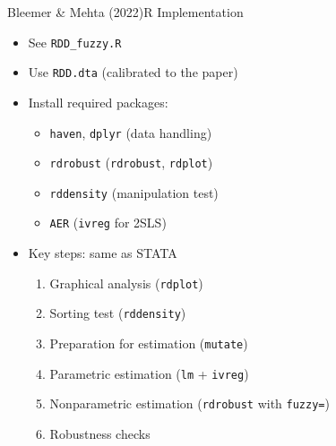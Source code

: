 \documentclass[hyperref={pdfpagelabels=false}]{beamer}
\begin{document}
\begin{frame}{Bleemer \& Mehta (2022)}{R Implementation}
	\begin{itemize}
		\item See \texttt{RDD\_fuzzy.R}
		\vspace{0.2cm}
		\item Use \texttt{RDD.dta} (calibrated to the paper)
		\vspace{0.2cm}
		\item Install required packages:
		\begin{itemize}
			\vspace{0.2cm}
			\item \texttt{haven}, \texttt{dplyr} (data handling)
			\item \texttt{rdrobust} (\texttt{rdrobust}, \texttt{rdplot})
			\item \texttt{rddensity} (manipulation test)
			\item \texttt{AER} (\texttt{ivreg} for 2SLS)
		\end{itemize}
		\vspace{0.2cm}
		\item Key steps: same as STATA
		\begin{enumerate}
			\vspace{0.2cm}
			\item Graphical analysis (\texttt{rdplot})
			\item Sorting test (\texttt{rddensity})
			\item Preparation for estimation (\texttt{mutate})
			\item Parametric estimation (\texttt{lm} + \texttt{ivreg})
			\item Nonparametric estimation (\texttt{rdrobust} with \texttt{fuzzy=})
			\item Robustness checks
		\end{enumerate}
	\end{itemize}
\end{frame}
\end{document}
